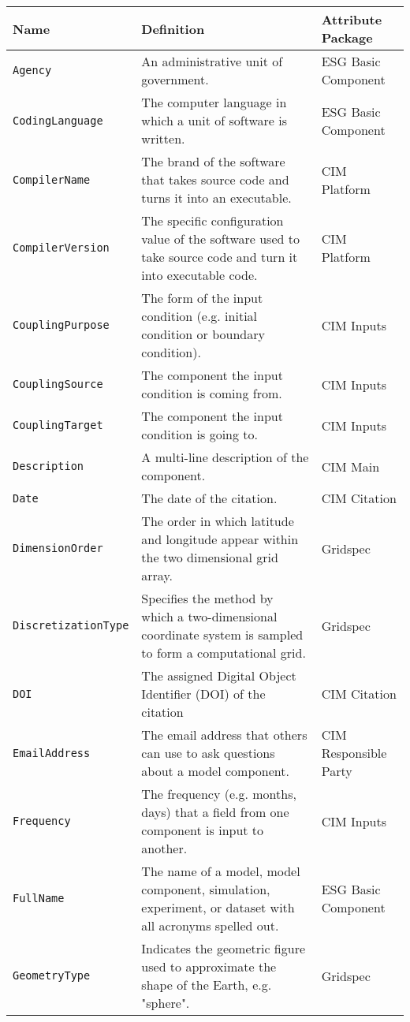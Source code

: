 \begin{tabular}{|p{8cm}|p{20cm}|p{10cm}}
     \hline\hline
     {\bf Name} & {\bf Definition} & {\bf Attribute Package}\\
     \hline\hline
     {\tt Agency} & An administrative unit of government.& ESG Basic Component\\
     {\tt CodingLanguage} & The computer language in which a unit of software is written. & ESG Basic Component\\
     {\tt CompilerName} & The brand of the software that takes source code and turns it into an executable.& CIM Platform\\
     {\tt CompilerVersion} & The specific configuration value of the software used to take source code and turn it into executable code. & CIM Platform\\
     {\tt CouplingPurpose} & The form of the input condition (e.g. initial condition or boundary condition). &  CIM Inputs \\
     {\tt CouplingSource} & The component the input condition is coming from. & CIM Inputs\\ 
     {\tt CouplingTarget} & The component the input condition is going to. & CIM Inputs\\ 
     {\tt Description} & A multi-line description of the component. & CIM Main \\
     {\tt Date} & The date of the citation. & CIM Citation\\
     {\tt DimensionOrder} & The order in which latitude and longitude appear within the two dimensional grid array. & Gridspec\\ 
     {\tt DiscretizationType} & Specifies the method by which a two-dimensional coordinate system is sampled to form a computational grid.& Gridspec \\
     {\tt DOI} & The assigned Digital Object Identifier (DOI) of the citation & CIM Citation\\
     {\tt EmailAddress} & The email address that others can use to ask questions about a model component. & CIM Responsible Party\\
     {\tt Frequency} & The frequency (e.g. months, days) that a field from one component is input to another. & CIM Inputs\\ 
     {\tt FullName} & The name of a model, model component, simulation, experiment, or dataset with all acronyms spelled out.& ESG Basic Component\\
     {\tt GeometryType} & Indicates the geometric figure used to approximate the shape of the Earth, e.g. "sphere". & Gridspec \\

\end{tabular}
